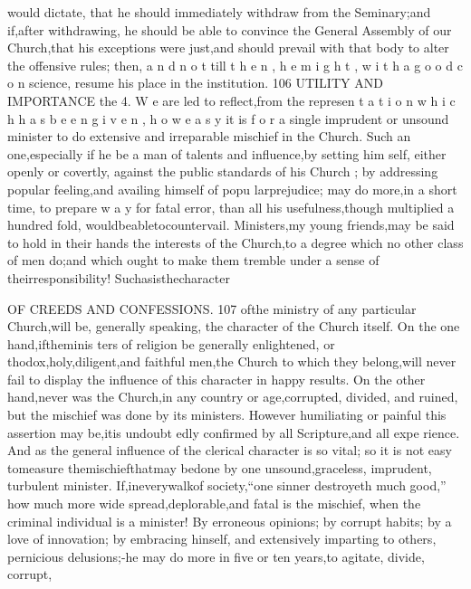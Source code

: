 \documentclass[
]{book}
\begin{document}
would dictate, that he should immediately withdraw from the Seminary;and if,after withdrawing, he should be able to convince the General Assembly of our Church,that his exceptions were just,and should prevail with that body to alter the offensive rules; then, a n d n o t till t h e n , h e m i g h t , w i t h a g o o d c o n
science, resume his place in the institution.
106 UTILITY AND IMPORTANCE
the
4. W e are led to reflect,from the represen t a t i o n w h i c h h a s b e e n g i v e n , h o w e a s y it is f o r a single imprudent or unsound minister to
do extensive and irreparable mischief in the Church. Such an one,especially if he be a man of talents and influence,by setting him self, either openly or covertly, against the public standards of his Church ; by addressing popular feeling,and availing himself of popu larprejudice; may do more,in a short time, to prepare w a y for fatal error, than all his usefulness,though multiplied a hundred fold, wouldbeabletocountervail. Ministers,my young friends,may be said to hold in their
hands the interests of the Church,to a degree which no other class of men do;and which ought to make them tremble under a sense of theirresponsibility! Suchasisthecharacter

OF CREEDS AND CONFESSIONS.
107
ofthe ministry of any particular Church,will
be, generally speaking, the character of the
Church itself. On the one hand,iftheminis
ters of religion be generally enlightened, or thodox,holy,diligent,and faithful men,the
Church to which they belong,will never fail to display the influence of this character in happy results.
On the other hand,never was
the Church,in any country or age,corrupted, divided, and ruined, but the mischief was done by its ministers. However humiliating or painful this assertion may be,itis undoubt
edly confirmed by all Scripture,and all expe
rience. And as the general influence of the clerical character is so vital; so it is not easy
tomeasure themischiefthatmay bedone by
one unsound,graceless, imprudent, turbulent minister. If,ineverywalkof society,``one
sinner destroyeth much good,'' how much more wide spread,deplorable,and fatal is the
mischief, when the criminal individual is a minister! By erroneous opinions; by corrupt habits; by a love of innovation; by embracing hinself, and extensively imparting to others, pernicious delusions;-he may do more in five or ten years,to agitate, divide, corrupt,
\end{document}

